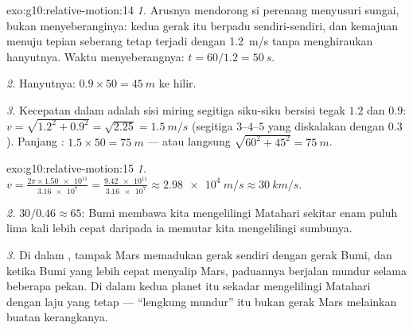 \begin{solution}{exo:g10:relative-motion:14}
\emph{1.} Arusnya mendorong si perenang menyusuri sungai, bukan
menyeberanginya: kedua gerak itu berpadu sendiri-sendiri, dan kemajuan
menuju tepian seberang tetap terjadi dengan \qty{1.2}{m/s} tanpa
menghiraukan hanyutnya. Waktu menyeberangnya:
$t = 60/1.2 = \qty{50}{s}$.

\emph{2.} Hanyutnya: $0.9 \times 50 = \qty{45}{m}$ ke hilir.

\emph{3.} Kecepatan dalam  adalah sisi miring segitiga
siku-siku bersisi tegak $1.2$ dan $0.9$:
$v = \sqrt{1.2^2 + 0.9^2} = \sqrt{2.25} = \qty{1.5}{m/s}$ (segitiga
$3$--$4$--$5$ yang diskalakan dengan $0.3$). Panjang :
$1.5 \times 50 = \qty{75}{m}$ --- atau langsung
$\sqrt{60^2 + 45^2} = \qty{75}{m}$.
\end{solution}

\begin{solution}{exo:g10:relative-motion:15}
\emph{1.} $v = \frac{2\pi \times \num{1.50e11}}{\num{3.16e7}}
= \frac{\num{9.42e11}}{\num{3.16e7}} \approx \qty{2.98e4}{m/s}
\approx \qty{30}{km/s}$.

\emph{2.} $30 / 0.46 \approx 65$: Bumi membawa kita mengelilingi
Matahari sekitar enam puluh lima kali lebih cepat daripada ia memutar
kita mengelilingi sumbunya.

\emph{3.} Di dalam ,  tampak Mars memadukan
gerak  sendiri dengan gerak  Bumi, dan ketika Bumi yang
lebih cepat menyalip Mars, paduannya berjalan mundur selama beberapa
pekan. Di dalam  kedua planet itu sekadar
mengelilingi Matahari dengan laju yang tetap --- ``lengkung mundur''
itu bukan gerak Mars melainkan buatan kerangkanya.
\end{solution}

